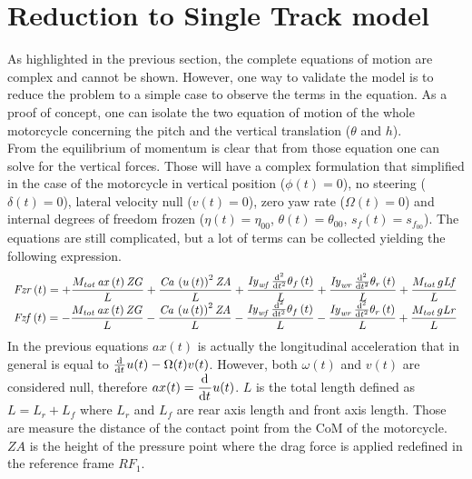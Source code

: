 \section{Reduction to Single Track model}
%
As highlighted in the previous section, the complete equations of motion are complex and cannot be shown. However, one way to validate the model is to reduce the problem to a simple case to observe the terms in the equation. As a proof of concept, one can isolate the two equation of motion of the whole motorcycle concerning the pitch and the vertical translation ($\theta$ and $h$).\\
%
%
From the equilibrium of momentum is clear that from those equation one can solve for the vertical forces. Those will have a complex formulation that simplified in the case of the motorcycle in vertical position ($\phi(t)=0$), no steering ($\delta(t)=0$), lateral velocity null ($v(t)=0$), zero yaw rate ($\Omega(t)=0$) and internal degrees of freedom frozen ($\eta(t)=\eta_{00}$, $\theta(t) = \theta_{00}$, $s_f(t)=s_{f_{00}}$). The equations are still complicated, but a lot of terms can be collected yielding the following expression.
%
\begin{equation}
    \label{eq:vertForces}
\begin{array}{c} 
\displaystyle
{\it Fzr} \left( t \right) =+{\frac {M_{{\it tot}}\,{\it ax} \left( t \right) {\it ZG}}{L}}+{\frac {{\it Ca}\,\left( u \left( t \right)  \right) ^{2}{\it ZA}}{L}}+{\frac {{\it Iy}_{{\it wf}}\,{\frac {{\rm d}^{2}}{{\rm d}{t}^{2}}}\theta_{f} \left( t \right) }{L}}+{\frac {{\it Iy}_{{\it wr}}\,{\frac {{\rm d}^{2}}{{\rm d}{t}^{2}}}\theta_{r} \left( t \right) }{L}}+{\frac {M_{{\it tot}}\,g{\it Lf}}{L}}\\
\displaystyle
{\it Fzf} \left( t \right) =-{\frac {M_{{\it tot}}\,{\it ax} \left( t \right) {\it ZG}}{L}}-{\frac {{\it Ca}\, \left( u \left( t \right)  \right) ^{2}{\it ZA}}{L}}-{\frac {{\it Iy}_{{\it wf}}\,{\frac {{\rm d}^{2}}{{\rm d}{t}^{2}}}\theta_{f} \left( t \right) }{L}}-{\frac {{\it Iy}_{{\it wr}}\,{\frac {{\rm d}^{2}}{{\rm d}{t}^{2}}}\theta_{r} \left( t \right) }{L}}+{\frac {M_{{\it tot}}\,g{\it Lr}}{L}}
\end{array}    
\end{equation}
%
In the previous equations $ax(t)$ is actually the longitudinal acceleration that in general is equal to $\frac {{\rm d}^{}}{{\rm d}{t}^{}}u(t)-\Omega(t) v(t)$. However, both $\omega(t)$ and $v(t)$ are considered null, therefore $\displaystyle ax(t) = \frac {{\rm d}^{}}{{\rm d}{t}^{}}u(t)$.
$L$ is the total length defined as $L= L_r+L_f$ where $L_r$ and $L_f$ are rear axis length and front axis length. Those are measure the distance of the contact point from the CoM of the motorcycle. $ZA$ is the height of the pressure point where the drag force is applied redefined in the reference frame $RF_1$.\\
